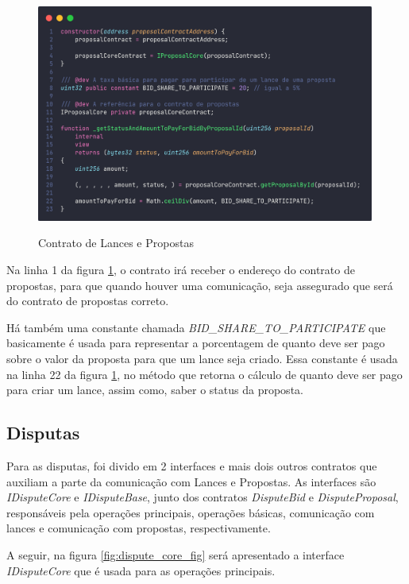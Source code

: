 \begin{figure}[!h]
  \centering
  \caption{Contrato de Lances e Propostas}
  \includegraphics[width=420px]{src/images/contracts/bid_proposal.png}
  \label{fig:bid_proposal_fig}
\end{figure}

Na linha 1 da figura \ref{fig:bid_proposal_fig}, o contrato irá receber o endereço do contrato de propostas, para que quando houver uma comunicação, seja assegurado que será do contrato de propostas correto. 

Há também uma constante chamada \textit{BID\_SHARE\_TO\_PARTICIPATE} que basicamente é usada para representar a porcentagem de quanto deve ser pago sobre o valor da proposta para que um lance seja criado. Essa constante é usada na linha 22 da figura \ref{fig:bid_proposal_fig}, no método que retorna o cálculo de quanto deve ser pago para criar um lance, assim como, saber o status da proposta.

\subsection{Disputas}

Para as disputas, foi divido em 2 interfaces e mais dois outros contratos que auxiliam a parte da comunicação com Lances e Propostas. As interfaces são \textit{IDisputeCore} e \textit{IDisputeBase}, junto dos contratos \textit{DisputeBid} e \textit{DisputeProposal}, responsáveis pela operações principais, operações básicas, comunicação com lances e comunicação com propostas, respectivamente.

A seguir, na figura \ref{fig:dispute_core_fig} será apresentado a interface \textit{IDisputeCore} que é usada para as operações principais.

